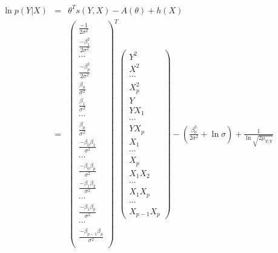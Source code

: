 \documentclass[11pt, oneside]{article}   	%
\numberwithin{figure}{section}
\numberwithin{equation}{section}
\numberwithin{table}{section}
\begin{document}
\begin{eqnarray*}
\ln p(Y|X) &=& \theta^T s(Y,X) - A(\theta) + h(X)\\
&=&
\begin{pmatrix}
\frac{-1}{2\sigma^2}\\
\frac{-\beta_1^2}{2\sigma^2}\\
\cdots\\
\frac{-\beta_p^2}{2\sigma^2}\\
\frac{\beta_0}{\sigma^2}\\
\frac{\beta_1}{\sigma^2}\\
\cdots\\
\frac{\beta_p}{\sigma^2}\\
\frac{-\beta_0\beta_1}{\sigma^2}\\
\cdots\\
\frac{-\beta_0\beta_p}{\sigma^2}\\
\frac{-\beta_1\beta_2}{\sigma^2}\\
\cdots\\
\frac{-\beta_1\beta_p}{\sigma^2}\\
\cdots\\
\frac{-\beta_{p-1}\beta_p}{\sigma^2}\\
\end{pmatrix}^T
\begin{pmatrix}
Y^2\\
X^2\\
\cdots\\
X_p^2\\
Y\\
YX_1\\
\cdots\\
YX_p\\
X_1\\
\cdots\\
X_p\\
X_1X_2\\
\cdots\\
X_1X_p\\
\cdots\\
X_{p-1}X_p
\end{pmatrix}
- \left( \frac{\beta_0^2}{2\sigma^2} + \ln{\sigma}\right) + \frac{1}{\ln{\sqrt{2\mu_{Y|X}}}}
\end{eqnarray*}


%
%
\end{document}
